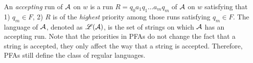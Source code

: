 An \emph{accepting} run of $\mathcal{A}$ on $w$ is a run $R = q_0 a_1 q_1 \ldots a_m q_m$ of $\mathcal{A}$ on $w$ satisfying that 1) $q_m \in F$, 2) $R$ is of the \emph{highest} priority among those runs satisfying $q_m \in F$. 
The language of $\mathcal{A}$, denoted as $\mathscr{L}(\mathcal{A})$, is the set of strings on which $\mathcal{A}$ has an accepting run.
%
Note that the priorities in PFAs do not change the fact that a string is accepted, they only affect the way that a string is accepted. Therefore, PFAs still define the class of regular languages. 




